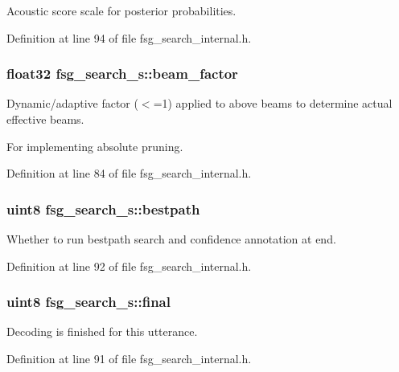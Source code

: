 Acoustic score scale for posterior probabilities. 



Definition at line 94 of file fsg\-\_\-search\-\_\-internal.\-h.

\subsubsection[{beam\-\_\-factor}]{\setlength{\rightskip}{0pt plus 5cm}float32 fsg\-\_\-search\-\_\-s\-::beam\-\_\-factor}\label{structfsg__search__s_a8e86d9f82189f8429d71ee2f67ecaaa2}


Dynamic/adaptive factor ($<$=1) applied to above beams to determine actual effective beams. 

For implementing absolute pruning. 

Definition at line 84 of file fsg\-\_\-search\-\_\-internal.\-h.

\subsubsection[{bestpath}]{\setlength{\rightskip}{0pt plus 5cm}uint8 fsg\-\_\-search\-\_\-s\-::bestpath}\label{structfsg__search__s_aba7eff57919c5a1de55eab3a62ff055a}


Whether to run bestpath search and confidence annotation at end. 



Definition at line 92 of file fsg\-\_\-search\-\_\-internal.\-h.

\subsubsection[{final}]{\setlength{\rightskip}{0pt plus 5cm}uint8 fsg\-\_\-search\-\_\-s\-::final}\label{structfsg__search__s_a5139d7ab35ae18407e06e78e1778f857}


Decoding is finished for this utterance. 



Definition at line 91 of file fsg\-\_\-search\-\_\-internal.\-h.

